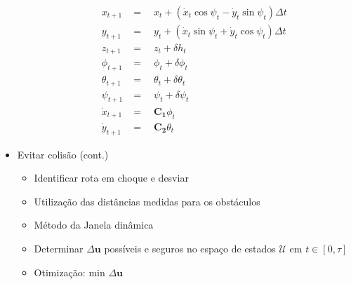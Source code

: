 \documentclass{beamer}
\begin{document}
\begin{frame}[allowframebreaks]
\begin{itemize}
\begin{itemize}
		\begin{equation}
		\begin{aligned}
		{ x }_{ t+1 } &=\quad { x }_{ t }+({ \dot { x }  }_{ t }{ \cos { \psi  }  }_{ t }-{ \dot { y }  }_{ t }{ \sin { \psi  }  }_{ t })\Delta t \\
		{ y }_{ t+1 } &=\quad y_{ t }+({ \dot { x }  }_{ t }{ \sin { \psi  }  }_{ t }+{ \dot { y }  }_{ t }{ \cos { \psi  }  }_{ t })\Delta t \\
		{ z }_{ t+1 } &=\quad { z }_{ t }+\delta { h }_{ t }\quad \\
		{ \phi  }_{ t+1 } &=\quad { \phi  }_{ t }+\delta { \phi  }_{ t }\quad \\
		{ \theta  }_{ t+1 } &=\quad { \theta  }_{ t }+\delta { \theta  }_{ t } \\
		{ \psi  }_{ t+1 } &=\quad \psi _{ t }+\delta { \psi  }_{ t } \\
		{ \dot { x }  }_{ t+1 } &=\quad \mathbf{{ C }_{ 1 }}{ \phi  }_{ t } \\
		{ \dot { y }  }_{ t+1 } &=\quad \mathbf{{ C }_{ 2 }}{ \theta  }_{ t }
		\end{aligned}
		\label{eq:equacaoProb}
		\end{equation}
		
	\end{itemize}	
	
	\framebreak
	
	\item Evitar colisão (cont.)
	
	\begin{itemize}
		
		\item Identificar rota em choque e desviar
		
		\item Utilização das distâncias medidas para os obstáculos
		
		\item Método da Janela dinâmica \cite{Saranrittichai2013}	
		
		
		\item Determinar $\Delta\mathbf{u}$  possíveis e seguros no espaço de estados $\mathcal{U}$ em $t \in [0,\tau]$
		
		\item Otimização: $\text{min } \Delta\mathbf{u}$
			
		
		
	\end{itemize}	
	
	
	\framebreak
	

\end{itemize}
\end{frame}
\end{document}
